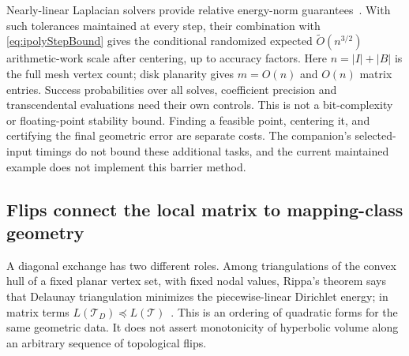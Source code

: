 Nearly-linear Laplacian solvers provide relative energy-norm
guarantees~\cite[Theorem~5.5]{SpielmanTengSolvers}. With such tolerances
maintained at every step, their combination with
\eqref{eq:ipolyStepBound} gives the conditional randomized expected
$\widetilde O(n^{3/2})$ arithmetic-work scale after centering, up to
accuracy factors. Here $n=|I|+|B|$ is the full mesh vertex count;
disk planarity gives $m=O(n)$ and $O(n)$ matrix entries.
Success probabilities over all solves,
coefficient precision and transcendental evaluations need their own
controls. This is not a bit-complexity or floating-point stability
bound. Finding a feasible point, centering it, and certifying the final
geometric error are separate costs. The companion's selected-input
timings do not bound these additional tasks, and the current maintained
example does not implement this barrier method.

\subsection{Flips connect the local matrix to mapping-class geometry}
\label{subsec:ipolyFlips}

A diagonal exchange has two different roles. Among triangulations of
the convex hull of a fixed planar vertex set, with fixed nodal values,
Rippa's theorem says that Delaunay
triangulation minimizes the piecewise-linear Dirichlet energy; in matrix
terms $L(\mathcal T_D)\preccurlyeq L(\mathcal T)$~\cite{RippaEnergy}.
This is an ordering of quadratic forms for the same geometric data.
It does not assert monotonicity of hyperbolic volume along an arbitrary
sequence of topological flips.


